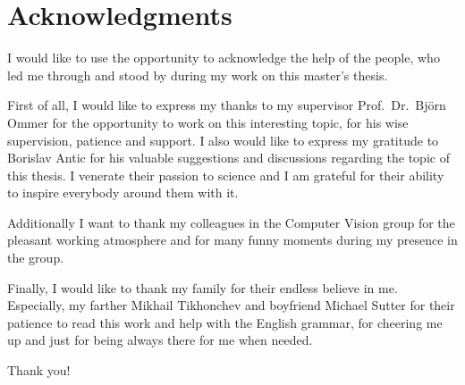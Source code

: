 
\chapter*{Acknowledgments}
\thispagestyle{empty}

I would like to use the opportunity to acknowledge the help of the people, who led me through and stood by during my work on this master's thesis.

First of all, I would like to express my thanks to my supervisor Prof.~Dr.~Bj\"{o}rn Ommer for the opportunity to work on this interesting topic, for his wise supervision, patience and support. I also would like to express my gratitude to Borislav Antic for his valuable suggestions and discussions regarding the topic of this thesis. I venerate their passion to science and I am grateful for their ability to inspire everybody around them with it.

Additionally I want to thank my colleagues in the Computer Vision group for the pleasant working atmosphere and for many funny moments during my presence in the group.

Finally, I would like to thank my family for their endless believe in me. Especially, my farther Mikhail Tikhonchev and boyfriend Michael Sutter for their patience to read this work and help with the English grammar, for cheering me up and just for being always there for me when needed.

Thank you!

